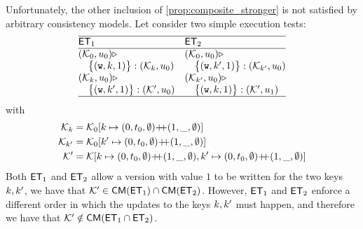 Unfortunately, the other inclusion of \cref{prop:composite_stronger} is not satisfied 
by arbitrary consistency models.
Let consider two simple execution tests: 
\[
\begin{array}{@{}l l@{}}
    \hline
    \ET_1 & \ET_2 \\
    \hline
    (\hh_{0}, \vi_{0}) \csat  
    &
    (\hh_{0}, \vi_{0}) \csat 
    \\
    \quad \Set{(\otW, \ke, 1)} : ( \hh_{\ke}, \vi_{0})
    &
    \quad \Set{(\otW, \ke', 1)} : ( \hh_{\ke'}, \vi_{0}) 
    \\
    (\hh_{\ke}, \vi_{0}) \csat 
    &
    (\hh_{\ke'}, \vi_{0}) \csat 
    \\
    \quad \Set{(\otW, \ke', 1)} : (\hh',\vi_{0}) 
    &
    \quad \Set{(\otW, \ke, 1)} : (\hh',\vi_{1}) 
    \\
\hline
\end{array}
\]
with 
\begin{align*}
    \hh_{\ke} & = \hh_{0}[\ke \mapsto (0, \txid_{0}, \emptyset) \lcat (1, \_, \emptyset)] \\
    \hh_{\ke'} & = \hh_{0}[\ke' \mapsto (0, \txid_{0}, \emptyset) \lcat (1, \_, \emptyset)] \\
    \hh' & = \hh[\ke \mapsto (0, \txid_{0}, \emptyset) \lcat (1, \_, \emptyset) 
                ,\ke' \mapsto (0, \txid_{0}, \emptyset) \lcat (1, \_, \emptyset)] \\
\end{align*}
Both $\mathsf{ET}_1$ and $\mathsf{ET}_2$ allow a version with value $1$ to be written for the two keys 
$k, k'$,  we have that $\mathcal{K}' \in \mathsf{CM}(\mathsf{ET}_1) \cap \mathsf{CM}(\mathsf{ET}_2)$. 
However, $\mathsf{ET}_1$ and $\mathsf{ET}_2$ enforce a different order in which the updates to the keys $k, k'$ must happen, 
and therefore we have that $\mathcal{K}' \notin \mathsf{CM}(\mathsf{ET}_1 \cap \mathsf{ET}_2)$. 

